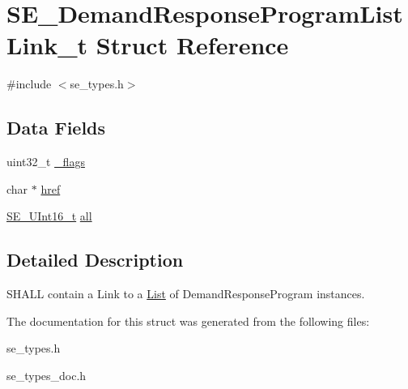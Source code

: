 \hypertarget{structSE__DemandResponseProgramListLink__t}{}\section{S\+E\+\_\+\+Demand\+Response\+Program\+List\+Link\+\_\+t Struct Reference}
\label{structSE__DemandResponseProgramListLink__t}


{\ttfamily \#include $<$se\+\_\+types.\+h$>$}

\subsection*{Data Fields}
\begin{DoxyCompactItemize}
\item 
uint32\+\_\+t \hyperlink{group__DemandResponseProgramListLink_ga5b5cab052676a036ef40ecca31c6593f}{\+\_\+flags}
\item 
char $\ast$ \hyperlink{group__DemandResponseProgramListLink_gaf28f0224cca8a7b18332791bff9195aa}{href}
\item 
\hyperlink{group__UInt16_gac68d541f189538bfd30cfaa712d20d29}{S\+E\+\_\+\+U\+Int16\+\_\+t} \hyperlink{group__DemandResponseProgramListLink_ga6905718c355c3790f83656fc77826b20}{all}
\end{DoxyCompactItemize}


\subsection{Detailed Description}
S\+H\+A\+LL contain a Link to a \hyperlink{structList}{List} of Demand\+Response\+Program instances. 

The documentation for this struct was generated from the following files\+:\begin{DoxyCompactItemize}
\item 
se\+\_\+types.\+h\item 
se\+\_\+types\+\_\+doc.\+h\end{DoxyCompactItemize}
